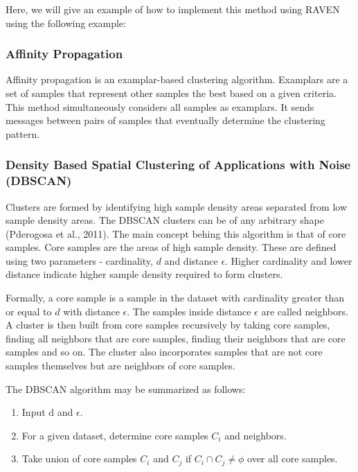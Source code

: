 \documentclass[11pt]{article}
\begin{document}
Here, we will give an example of how to implement this method using RAVEN using the following example:



\subsubsection{Affinity Propagation}

Affinity propagation is an examplar-based clustering algorithm. Examplars are a set of samples that represent other samples the best based on a given criteria. This method simultaneously considers all samples as examplars. It sends messages between pairs of samples that eventually determine the clustering pattern. 


\subsubsection{Density Based Spatial Clustering of Applications with Noise (DBSCAN)}

Clusters are formed by identifying high sample density areas separated from low sample density areas. The DBSCAN clusters can be of any arbitrary shape (Pderogosa et al., 2011). The main concept behing this algorithm is that of core samples. Core samples are the areas of high sample density. These are defined using two parameters - cardinality, $d$ and distance $\epsilon$. Higher cardinality and lower distance indicate higher sample density required to form clusters.

Formally, a core sample is a sample in the dataset with cardinality greater than or equal to $d$ with distance $\epsilon$. The samples inside distance $\epsilon$ are called neighbors. A cluster is then built from core samples recursively by taking core samples, finding all neighbors that are core samples, finding their neighbors that are core samples and so on. The cluster also incorporates samples that are not core samples themselves but are neighbors of core samples. 

The DBSCAN algorithm may be summarized as follows:

\begin{enumerate}

\item Input d and $\epsilon$.

\item For a given dataset, determine core samples $C_i$ and neighbors.  

\item Take union of core samples $C_i$ and $C_j$ if $C_i \cap C_j \neq \phi$ over all core samples. 


\end{enumerate}
\end{document}
